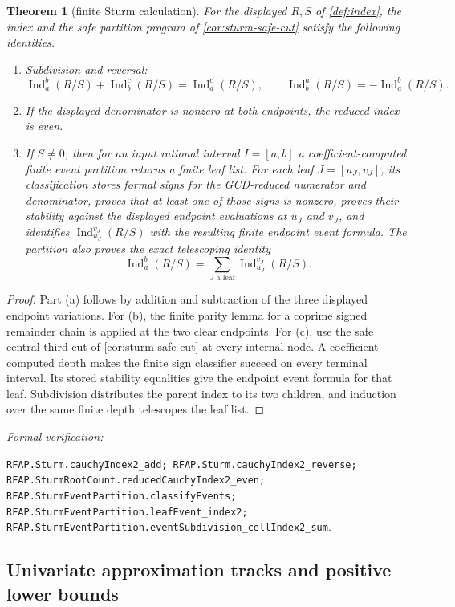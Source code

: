 \documentclass[11pt]{article}
\newtheorem{theorem}{Theorem}[section]
\newcommand{\Ind}{\operatorname{Ind}}
\newcommand{\leanref}[1]{\par\smallskip\noindent
  \emph{Formal verification:}\par\nobreak
  {\raggedright\nolinkurl{#1}.\par}}
\begin{document}
\begin{theorem}[finite Sturm calculation]
\label{thm:sturm}
For the displayed $R,S$ of \cref{def:index}, the index and the safe
partition program of \cref{cor:sturm-safe-cut} satisfy the following
identities.
\begin{enumerate}[label=(\alph*)]
\item Subdivision and reversal:
\[
 \Ind_a^b(R/S)+\Ind_b^c(R/S)=\Ind_a^c(R/S),\qquad
 \Ind_b^a(R/S)=-\Ind_a^b(R/S).
\]
\item If the displayed denominator is nonzero at both endpoints, the
reduced index is even.
\item If $S\ne0$, then for an input rational interval $I=[a,b]$ a
coefficient-computed finite event partition returns a finite leaf list.  For each leaf
$J=[u_J,v_J]$, its classification stores formal signs for
the GCD-reduced numerator and denominator, proves that at least one of those
signs is nonzero, proves their stability against the displayed endpoint
evaluations at $u_J$ and $v_J$, and identifies
$\Ind_{u_J}^{v_J}(R/S)$ with the resulting finite endpoint event formula.
The partition also proves the exact telescoping identity
\[
 \Ind_a^b(R/S)
 =\sum_{J\text{ a leaf}}\Ind_{u_J}^{v_J}(R/S).
\]
\end{enumerate}
\end{theorem}

\begin{proof}
Part (a) follows by addition and subtraction of the three displayed endpoint
variations.  For (b), the finite parity lemma for a coprime signed remainder
chain is applied at the two clear endpoints.  For (c), use the safe
central-third cut of \cref{cor:sturm-safe-cut} at every internal node.
A coefficient-computed depth makes the finite sign classifier succeed on
every terminal interval.  Its stored stability equalities give the endpoint
event formula for that leaf.  Subdivision distributes the parent index to
its two children, and induction over the same finite depth telescopes the
leaf list.
\end{proof}

\leanref{RFAP.Sturm.cauchyIndex2_add; RFAP.Sturm.cauchyIndex2_reverse;
RFAP.SturmRootCount.reducedCauchyIndex2_even;
RFAP.SturmEventPartition.classifyEvents;
RFAP.SturmEventPartition.leafEvent_index2;
RFAP.SturmEventPartition.eventSubdivision_cellIndex2_sum}

\subsection{Univariate approximation tracks and positive lower bounds}
\end{document}
